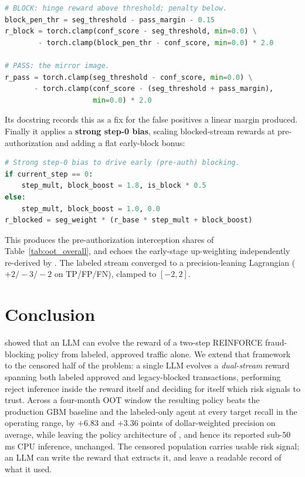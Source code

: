 \documentclass[11pt]{article}
\begin{document}
\begin{lstlisting}[language=Python, basicstyle=\ttfamily\scriptsize, backgroundcolor=\color{highlight}, numbers=none, frame=none]
# BLOCK: hinge reward above threshold; penalty below.
block_pen_thr = seg_threshold - pass_margin - 0.15
r_block = torch.clamp(conf_score - seg_threshold, min=0.0) \
        - torch.clamp(block_pen_thr - conf_score, min=0.0) * 2.0

# PASS: the mirror image.
r_pass = torch.clamp(seg_threshold - conf_score, min=0.0) \
       - torch.clamp(conf_score - (seg_threshold + pass_margin),
                     min=0.0) * 2.0
\end{lstlisting}

\noindent Its docstring records this as a fix for the false positives a linear margin produced.
Finally it applies a \textbf{strong step-0 bias}, scaling blocked-stream rewards at
pre-authorization and adding a flat early-block bonus:

\begin{lstlisting}[language=Python, basicstyle=\ttfamily\scriptsize, backgroundcolor=\color{highlight}, numbers=none, frame=none]
# Strong step-0 bias to drive early (pre-auth) blocking.
if current_step == 0:
    step_mult, block_boost = 1.8, is_block * 0.5
else:
    step_mult, block_boost = 1.0, 0.0
r_blocked = seg_weight * (r_base * step_mult + block_boost)
\end{lstlisting}

\noindent This produces the pre-authorization interception shares of
Table~\ref{tab:oot_overall}, and echoes the early-stage up-weighting independently re-derived by
\citet{qu2025llmenhanced}. The labeled stream converged to a precision-leaning Lagrangian
($+2/{-}3/{-}2$ on TP/FP/FN), clamped to $[-2,2]$.

\section{Conclusion}
\citet{qu2025llmenhanced} showed that an LLM can evolve the reward of a two-step REINFORCE
fraud-blocking policy from labeled, approved traffic alone. We extend that framework to the
censored half of the problem: a single LLM evolves a \emph{dual-stream} reward spanning both
labeled approved and legacy-blocked transactions, performing reject inference inside the reward
itself and deciding for itself which risk signals to trust. Across a four-month OOT window the
resulting policy beats the production GBM baseline and the labeled-only agent at every target
recall in the operating range, by $+6.83$ and $+3.36$ points of dollar-weighted precision on
average, while leaving the policy architecture of \citet{qu2025llmenhanced}, and hence its reported
sub-50\,ms CPU inference, unchanged. The censored population carries usable risk signal; an LLM
can write the reward that extracts it, and leave a readable record of what it used.
\end{document}
